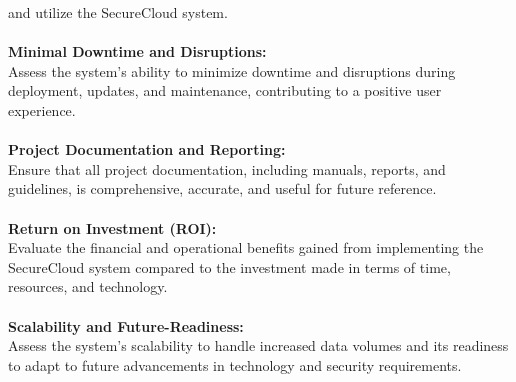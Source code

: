and utilize the SecureCloud system.
\\
\\
\textbf{Minimal Downtime and Disruptions:}\\
Assess the system's ability to minimize downtime and disruptions during deployment, updates, and
maintenance, contributing to a positive user experience.
\\
\\
\textbf{Project Documentation and Reporting:}\\
Ensure that all project documentation, including manuals, reports, and guidelines, is comprehensive,
accurate, and useful for future reference. 
\\
\\
\textbf{Return on Investment (ROI): }\\
Evaluate the financial and operational benefits gained from implementing the SecureCloud system
compared to the investment made in terms of time, resources, and technology. 
\\
\\
\textbf{Scalability and Future-Readiness: }\\
Assess the system's scalability to handle increased data volumes and its readiness to adapt to future
advancements in technology and security requirements. 
\\
\\

\small


\newpage

\clearpage